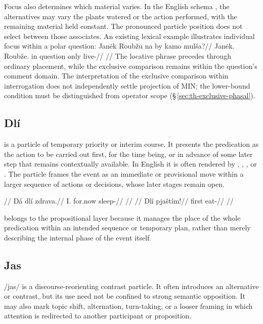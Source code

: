 Focus also determines which material varies. In the English schema
, the alternatives may vary the
plants watered or the action performed, with the remaining material held
constant. The pronounced particle position does not select between those
associates. An existing lexical example illustrates individual focus within
a polar question:
\pex
\begingl
\gla Janėk Roubžu na by kamo mulša?//
\glb Janėk.\Dir{} Roubže.\Ind{} in question only live-\Cont{}//
\glft {}//
\endgl
\xe
The locative phrase precedes  through ordinary placement, while
the exclusive comparison remains within the question's comment domain.
The interpretation of the exclusive comparison within interrogation does
not independently settle projection of MIN; the lower-bound condition must
be distinguished from operator scope
(§\,\ref{sec:th-exclusive-phasal}).

\subsection{Dlí}  is a particle of temporary priority or interim
course. It presents the predication as the action to be carried out first, for
the time being, or in advance of some later step that remains contextually
available. In English it is often rendered by , ,
, or . The particle frames the event as an immediate or provisional move within a
larger sequence of actions or decisions, whose later stages remain open.

\pex
\a
\begingl
\glpreamble {}//
\gla Dá dlí zdrava.//
\glb I.\Dir{} for.now sleep-\Cont{}//
\glft {}//
\endgl
\a
\begingl
\glpreamble {}//
\gla Dlí pjaštím!//
\glb first eat-\Imp{}//
\glft {}//
\endgl
\xe

 belongs to the propositional layer because
it manages the place of the whole predication within an intended sequence or
temporary plan, rather than merely describing the internal phase of the event
itself.

\subsection{Jas}  /jas/ is a discourse-reorienting contrast particle. It
often introduces an alternative or contrast, but its use need not be confined
to strong semantic opposition. It may also mark topic shift, alternation,
turn-taking, or a looser  framing in which attention is
redirected to another participant or proposition.

